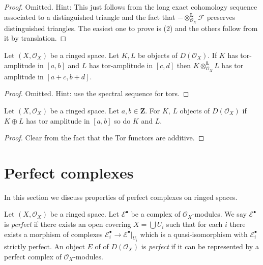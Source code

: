 \begin{proof}
Omitted. Hint: This just follows from the long exact cohomology sequence
associated to a distinguished triangle and the fact that
$- \otimes_{\mathcal{O}_X}^{\mathbf{L}} \mathcal{F}$
preserves distinguished triangles.
The easiest one to prove is (2) and the others follow from it by
translation.
\end{proof}

\begin{lemma}
\label{lemma-tensor-tor-amplitude}
Let $(X, \mathcal{O}_X)$ be a ringed space. Let $K, L$ be objects of
$D(\mathcal{O}_X)$. If $K$ has tor-amplitude in $[a, b]$ and
$L$ has tor-amplitude in $[c, d]$ then $K \otimes_{\mathcal{O}_X}^\mathbf{L} L$
has tor amplitude in $[a + c, b + d]$.
\end{lemma}

\begin{proof}
Omitted. Hint: use the spectral sequence for tors.
\end{proof}

\begin{lemma}
\label{lemma-summands-tor-amplitude}
Let $(X, \mathcal{O}_X)$ be a ringed space. Let $a, b \in \mathbf{Z}$.
For $K$, $L$ objects of $D(\mathcal{O}_X)$ if $K \oplus L$ has tor
amplitude in $[a, b]$ so do $K$ and $L$.
\end{lemma}

\begin{proof}
Clear from the fact that the Tor functors are additive.
\end{proof}






\section{Perfect complexes}
\label{section-perfect}

\noindent
In this section we discuss properties of perfect complexes on
ringed spaces.

\begin{definition}
\label{definition-perfect}
Let $(X, \mathcal{O}_X)$ be a ringed space.
Let $\mathcal{E}^\bullet$ be a complex of $\mathcal{O}_X$-modules.
We say $\mathcal{E}^\bullet$ is {\it perfect} if there exists
an open covering $X = \bigcup U_i$ such that for each $i$
there exists a morphism of complexes
$\mathcal{E}_i^\bullet \to \mathcal{E}^\bullet|_{U_i}$
which is a quasi-isomorphism with $\mathcal{E}_i^\bullet$
strictly perfect.
An object $E$ of of $D(\mathcal{O}_X)$ is {\it perfect}
if it can be represented by a perfect complex of $\mathcal{O}_X$-modules.
\end{definition}

